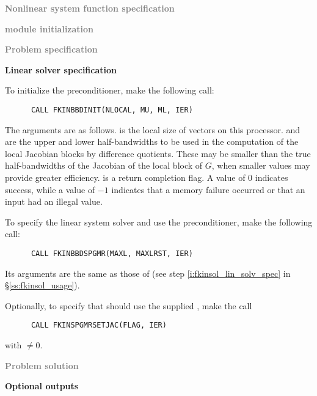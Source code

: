 \begin{Steps}
  
\item \textcolor{gray}{\bf Nonlinear system function specification}

\item \textcolor{gray}{\bf {\nvector} module initialization}

\item \textcolor{gray}{\bf Problem specification}

\item {\bf Linear solver specification}

  To initialize the {\kinbbdpre} preconditioner, make the following call:
\begin{verbatim}
      CALL FKINBBDINIT(NLOCAL, MU, ML, IER)
\end{verbatim}
  The arguments are as follows.
   is the local size of vectors on this processor.
   and  are the upper and lower half-bandwidths to be used in 
  the computation of the local Jacobian blocks by difference quotients.
  These may be smaller than the true half-bandwidths of the
  Jacobian of the local block of $G$, when smaller values may
  provide greater efficiency.
   is a return completion flag.  A value of $0$ indicates success, while
  a value of $-1$ indicates that a memory failure occurred or that an input had
  an illegal value.
  
  To specify the {\spgmr} linear system solver and use the {\kinbbdpre}
  preconditioner, make the following call:
\begin{verbatim}
      CALL FKINBBDSPGMR(MAXL, MAXLRST, IER)
\end{verbatim}
  Its arguments are the same as those of 
  (see step \ref{i:fkinsol_lin_solv_spec} in \S\ref{ss:fkinsol_usage}).
  
  Optionally, to specify that {\spgmr} should use the supplied , 
  make the call
\begin{verbatim}
      CALL FKINSPGMRSETJAC(FLAG, IER)
\end{verbatim}
  with  $\neq 0$.
  
\item \textcolor{gray}{\bf Problem solution}
  
\item {\bf {\cvbbdpre} Optional outputs}
  

\end{Steps}
